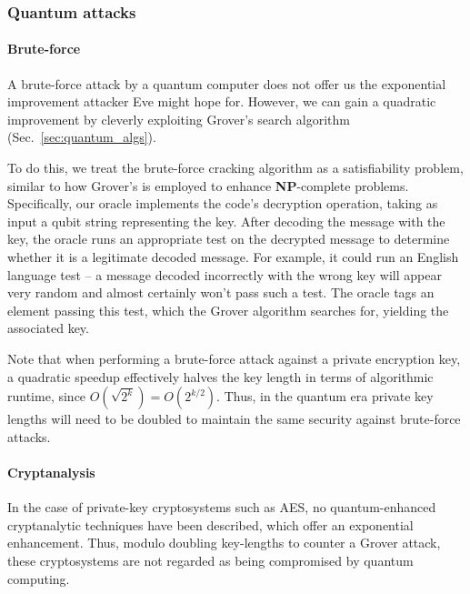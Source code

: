 %
%

\subsubsection{Quantum attacks}

%
%

\paragraph{Brute-force}

A brute-force attack by a quantum computer does not offer us the exponential improvement attacker Eve might hope for. However, we can gain a quadratic improvement by cleverly exploiting Grover's search algorithm (Sec.~\ref{sec:quantum_algs}).

To do this, we treat the brute-force cracking algorithm as a satisfiability problem, similar to how Grover's is employed to enhance \textbf{NP}-complete problems. Specifically, our oracle implements the code's decryption operation, taking as input a qubit string representing the key. After decoding the message with the key, the oracle runs an appropriate test on the decrypted message to determine whether it is a legitimate decoded message. For example, it could run an English language test -- a message decoded incorrectly with the wrong key will appear very random and almost certainly won't pass such a test. The oracle tags an element passing this test, which the Grover algorithm searches for, yielding the associated key.

Note that when performing a brute-force attack against a private encryption key, a quadratic speedup effectively halves the key length in terms of algorithmic runtime, since \mbox{$O(\sqrt{2^k}) = O(2^{k/2})$}. Thus, in the quantum era private key lengths will need to be doubled to maintain the same security against brute-force attacks.

%
%

\paragraph{Cryptanalysis}

In the case of private-key cryptosystems such as AES, no quantum-enhanced cryptanalytic techniques have been described, which offer an exponential enhancement. Thus, modulo doubling key-lengths to counter a Grover attack, these cryptosystems are not regarded as being compromised by quantum computing.

